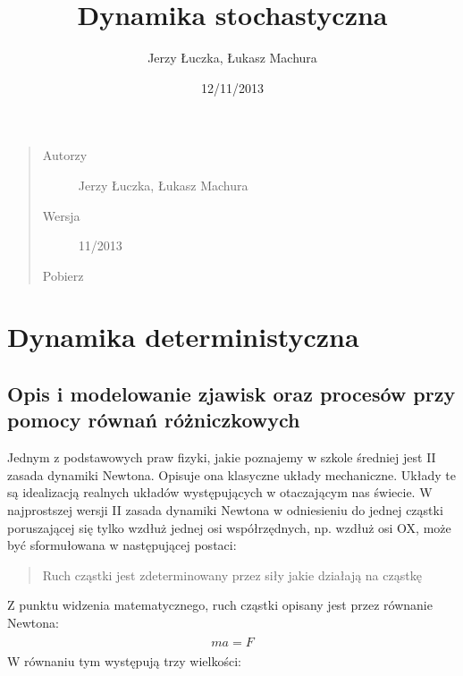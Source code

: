 \documentclass[a4paper,12pt,polish]{sphinxmanual}
\title{Dynamika stochastyczna}
\date{12/11/2013}
\author{Jerzy Łuczka, Łukasz Machura}
\begin{document}
\maketitle
\tableofcontents
{}\label{index::doc}

\begin{quote}\begin{description}
\item[{Autorzy}] \leavevmode
Jerzy Łuczka,
Łukasz Machura

\item[{Wersja}]  11/2013

\item[{Pobierz}] \leavevmode
{}

\end{description}\end{quote}


\chapter{Dynamika deterministyczna}
\label{index:dynamika-stochastyczna}\label{index:dynamika-deterministyczna}

\section{Opis i modelowanie zjawisk oraz procesów przy pomocy równań różniczkowych}
\label{ch1/chI011:opis-i-modelowanie-zjawisk-oraz-procesow-przy-pomocy-rownan-rozniczkowych}\label{ch1/chI011::doc}
Jednym z podstawowych praw fizyki, jakie poznajemy w szkole średniej jest II zasada dynamiki Newtona. Opisuje ona klasyczne układy mechaniczne. Układy te są idealizacją realnych układów występujących w otaczającym nas świecie. W najprostszej wersji II zasada dynamiki Newtona w odniesieniu do jednej cząstki poruszającej się tylko wzdłuż jednej osi współrzędnych, np. wzdłuż osi OX, może być sformułowana w następującej postaci:
\begin{quote}

Ruch cząstki jest zdeterminowany przez siły jakie działają na cząstkę
\end{quote}

Z punktu widzenia matematycznego, ruch cząstki opisany jest przez równanie Newtona:
\label{ch1/chI011:equation-eqn1}\begin{gather}
\begin{split}m a = F\end{split}\label{ch1/chI011-eqn1}
\end{gather}
W równaniu tym występują trzy wielkości:
\end{document}
